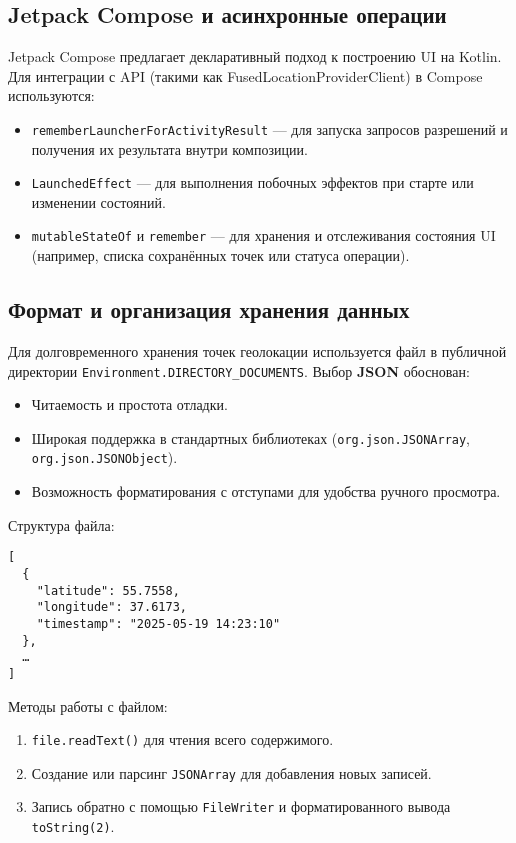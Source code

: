 \subsection*{Jetpack Compose и асинхронные операции}
Jetpack Compose предлагает декларативный подход к построению UI на Kotlin\cite{compose_runtime,kotlin_reference}. Для интеграции с API (такими как FusedLocationProviderClient\cite{fused_location_api}) в Compose используются:
\begin{itemize}
    \item \texttt{rememberLauncherForActivityResult} — для запуска запросов разрешений и получения их результата внутри композиции.
    \item \texttt{LaunchedEffect} — для выполнения побочных эффектов при старте или изменении состояний.
    \item \texttt{mutableStateOf} и \texttt{remember} — для хранения и отслеживания состояния UI (например, списка сохранённых точек или статуса операции).
\end{itemize}

\subsection*{Формат и организация хранения данных}
Для долговременного хранения точек геолокации используется файл в публичной директории \texttt{Environment.DIRECTORY\_DOCUMENTS}. Выбор \textbf{JSON} обоснован:
\begin{itemize}
    \item Читаемость и простота отладки.
    \item Широкая поддержка в стандартных библиотеках (\texttt{org.json.JSONArray}, \texttt{org.json.JSONObject}).
    \item Возможность форматирования с отступами для удобства ручного просмотра.
\end{itemize}
Структура файла:
\begin{verbatim}
[
  {
    "latitude": 55.7558,
    "longitude": 37.6173,
    "timestamp": "2025-05-19 14:23:10"
  },
  … 
]
\end{verbatim} 
Методы работы с файлом:
\begin{enumerate}
    \item \texttt{file.readText()} для чтения всего содержимого.
    \item Создание или парсинг \texttt{JSONArray} для добавления новых записей.
    \item Запись обратно с помощью \texttt{FileWriter} и форматированного вывода \texttt{toString(2)}.
\end{enumerate}

